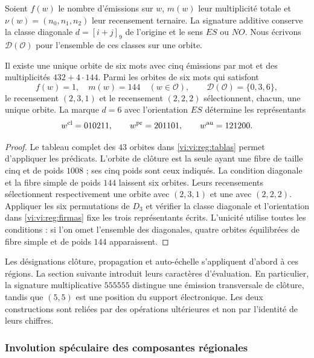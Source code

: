 Soient \(f(w)\) le nombre d’émissions sur \(w\), \(m(w)\)
leur multiplicité totale et \(\nu(w)=(n_0,n_1,n_2)\) leur recensement
ternaire. La signature additive conserve la classe diagonale
\(d=[i+j]_9\) de l’origine et le sens \(ES\) ou \(NO\).
Nous écrivons \(\mathcal D(\mathcal O)\) pour l’ensemble de ces
classes sur une orbite.

\begin{proposition}
\label{vi:vi:reg:seleccion}
Il existe une unique orbite de six mots avec cinq émissions par
mot et des multiplicités \(432+4\cdot144\). Parmi les orbites
de six mots qui satisfont
\[
 f(w)=1,\quad m(w)=144\quad(w\in\mathcal O),\qquad
 \mathcal D(\mathcal O)=\{0,3,6\},
\]
le recensement \((2,3,1)\) et le recensement \((2,2,2)\) sélectionnent,
chacun, une unique orbite. La marque \(d=6\) avec l’orientation
\(ES\) détermine les représentants
\[
 w^{\rm cl}=010211,\qquad w^{\rm pr}=201101,
 \qquad w^{\rm au}=121200.
\]
\end{proposition}
\begin{proof}
Le tableau complet des \(43\) orbites dans
\ref{vi:vi:reg:tablas} permet d’appliquer les prédicats. L’orbite de
clôture est la seule ayant une fibre de taille cinq et de poids \(1008\) ;
ses cinq poids sont ceux indiqués. La condition diagonale et la
fibre simple de poids \(144\) laissent six orbites. Leurs recensements
sélectionnent respectivement une orbite avec \((2,3,1)\) et une avec
\((2,2,2)\). Appliquer les six permutations de \(D_3\) et
vérifier la classe diagonale et l’orientation dans
\eqref{vi:vi:reg:firmas} fixe les trois représentants écrits.
L’unicité utilise toutes les conditions : si l’on omet l’ensemble des
diagonales, quatre orbites équilibrées de fibre simple
et de poids \(144\) apparaissent.
\end{proof}

Les désignations clôture, propagation et auto-échelle s’appliquent
d’abord à ces régions. La section suivante introduit leurs
caractères d’évaluation. En particulier, la signature multiplicative
\(555555\) distingue une émission transversale de clôture, tandis
que \((5,5)\) est une position du support électronique. Les deux
constructions sont reliées par des opérations ultérieures et non
par l’identité de leurs chiffres.

\subsubsection{Involution spéculaire des composantes régionales}
\label{vi:mono-ampl:regiones}

